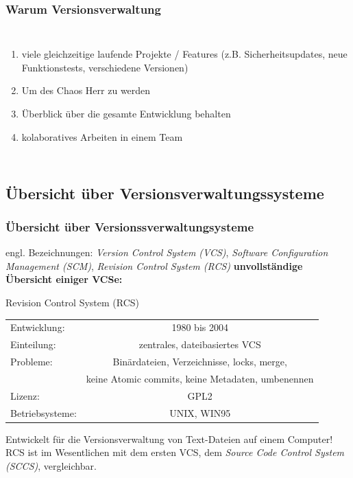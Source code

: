 \documentclass{beamer}
\begin{document}
\begin{frame}\frametitle{Warum Versionsverwaltung}
\begin{columns}
                \begin{enumerate}
                \item viele gleichzeitige laufende Projekte / Features (z.B. Sicherheitsupdates, neue  Funktionstests, verschiedene Versionen)
                \item Um des Chaos Herr zu werden
                \item Überblick über die gesamte Entwicklung behalten
                \item kolaboratives Arbeiten in einem Team
                \end{enumerate}
\end{columns}
\end{frame}

\subsection{Übersicht über Versionsverwaltungssysteme}

\begin{frame}\frametitle{Übersicht über Versionssverwaltungsysteme} 
engl. Bezeichnungen: \textit{Version Control System (VCS)}, \textit{Software Configuration Management (SCM)}, \textit{Revision Control System (RCS)}
\vspace*{0.15cm}
\textbf{unvollständige Übersicht einiger VCSe:}
\begin{block}{Revision Control System (RCS)}
	\begin{tabular}{l c}
Entwicklung: & 1980 bis 2004  \\  
Einteilung: & zentrales, dateibasiertes VCS \\ 
Probleme: & Binärdateien, Verzeichnisse, locks, merge, \\
          & keine Atomic commits, keine Metadaten, umbenennen  \\
Lizenz: & GPL2 \\
Betriebsysteme: & UNIX, WIN95 \\

\end{tabular} 

\vspace*{0.3cm}
Entwickelt für die Versionsverwaltung von Text-Dateien auf einem Computer!
RCS ist im Wesentlichen mit dem ersten VCS, dem \textit{Source Code Control System (SCCS)}, vergleichbar.
\end{block}
\end{frame}
\end{document}
